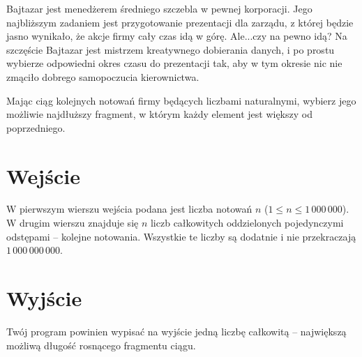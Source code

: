 \documentclass{spiral-kurs}
\begin{document}
  \makeheader

      Bajtazar jest menedżerem średniego szczebla w pewnej korporacji. Jego najbliższym zadaniem jest przygotowanie prezentacji dla zarządu, z której będzie jasno wynikało, że akcje firmy cały czas idą w górę. Ale...czy na pewno idą? Na szczęście Bajtazar jest mistrzem kreatywnego dobierania danych, i po prostu wybierze odpowiedni okres czasu do prezentacji tak, aby w tym okresie nic nie zmąciło dobrego samopoczucia kierownictwa.

      Mając ciąg kolejnych notowań firmy będących liczbami naturalnymi, wybierz jego możliwie najdłuższy fragment, w którym każdy element jest większy od poprzedniego.


  \section{Wejście}
      W pierwszym wierszu wejścia podana jest liczba notowań $n$ ($1 \leq n \leq 1\,000\,000$). W drugim wierszu znajduje się $n$ liczb całkowitych oddzielonych pojedynczymi odstępami -- kolejne notowania. Wszystkie te liczby są dodatnie i nie przekraczają $1\,000\,000\,000$.


  \section{Wyjście}
      Twój program powinien wypisać na wyjście jedną liczbę całkowitą -- największą możliwą długość rosnącego fragmentu ciągu.

\end{document}
